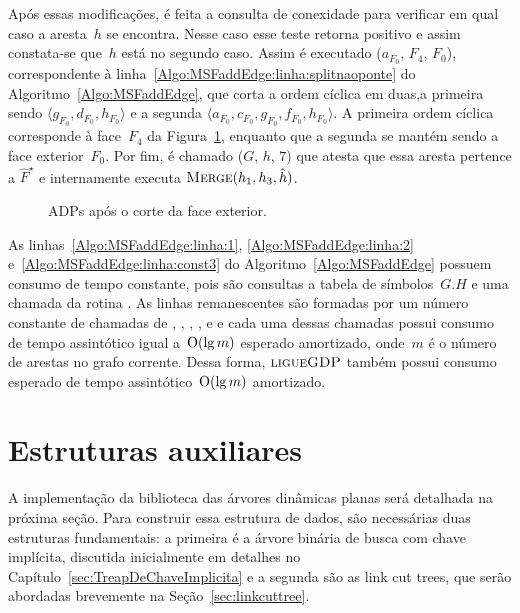 Após essas modificações, é feita a consulta de conexidade para verificar em qual caso a aresta~$h$ se encontra.
Nesse caso esse teste retorna positivo e assim constata-se que~$h$ está no segundo caso.
Assim é executado \LCOSplit($a_{F_0}$, $F_4$, $F_0$), correspondente à linha~\ref{Algo:MSFaddEdge:linha:splitnaoponte} do Algoritmo~\ref{Algo:MSFaddEdge}, que corta a ordem cíclica em duas,a primeira sendo $\langle g_{F_0}, d_{F_0}, h_{F_0}\rangle$ e a segunda $\langle a_{F_0}, c_{F_0}, g_{F_0}, f_{F_0}, h_{F_0}\rangle$.
A primeira ordem cíclica corresponde à face~$F_4$ da Figura~\ref{fig:MSF-adiciona-nao-ponte-2}, enquanto que a segunda se mantém sendo a face exterior~$F_0$.
Por fim, é chamado \MSFupdate($G$, $h$, $7$) que atesta que essa aresta pertence a $\hat F^\star$ e internamente executa $\text{\scshape Merge}(h_1, h_3, \hat h)$.

\begin{figure}
\scalebox{.95}{

}
\caption{ADPs após o corte da face exterior.}
\label{fig:MSF-adiciona-nao-ponte-2}
\end{figure}



As linhas~\ref{Algo:MSFaddEdge:linha:1}, \ref{Algo:MSFaddEdge:linha:2} e~\ref{Algo:MSFaddEdge:linha:const3} do Algoritmo~\ref{Algo:MSFaddEdge} possuem consumo de tempo constante, pois são consultas a tabela de símbolos~$G.H$ e uma chamada da rotina \LCOMakeOcto{}.
As linhas remanescentes são formadas por um número constante de chamadas de \LCOFindNode, \LCOCycle{}, \LCOMerge{}, \LCOSplit{}, \MSFupdate{} e \LCOConnected{} e cada uma dessas chamadas possui consumo de tempo assintótico igual a~$\mathrm{O}(\lg m)$ esperado amortizado, onde~$m$ é o número de arestas no grafo corrente.
Dessa forma, $\text{\scshape ligueGDP}$ também possui consumo esperado de tempo assintótico~$\mathrm{O}(\lg m)$ amortizado.

\section{Estruturas auxiliares}
\label{sec:struct-aux}

A implementação da biblioteca das árvores dinâmicas planas será detalhada na próxima seção.
Para construir essa estrutura de dados, são necessárias duas estruturas fundamentais: a primeira é a árvore binária de busca com chave implícita, discutida inicialmente em detalhes no Capítulo~\ref{sec:TreapDeChaveImplicita} e a segunda são as link cut trees, que serão abordadas brevemente na Seção~\ref{sec:linkcuttree}.

